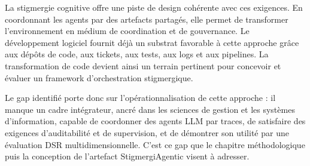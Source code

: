 La stigmergie cognitive offre une piste de design cohérente avec ces exigences. En coordonnant les agents par des artefacts partagés, elle permet de transformer l'environnement en médium de coordination et de gouvernance. Le développement logiciel fournit déjà un substrat favorable à cette approche grâce aux dépôts de code, aux tickets, aux tests, aux logs et aux pipelines. La transformation de code devient ainsi un terrain pertinent pour concevoir et évaluer un framework d'orchestration stigmergique.

Le gap identifié porte donc sur l'opérationnalisation de cette approche : il manque un cadre intégrateur, ancré dans les sciences de gestion et les systèmes d'information, capable de coordonner des agents LLM par traces, de satisfaire des exigences d'auditabilité et de supervision, et de démontrer son utilité par une évaluation DSR multidimensionnelle. C'est ce gap que le chapitre méthodologique puis la conception de l'artefact StigmergiAgentic visent à adresser.
